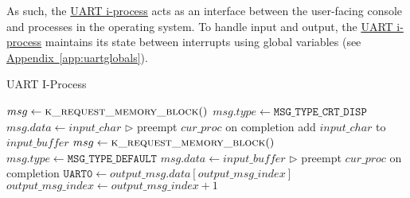 \documentclass[12pt]{report}
\begin{document}
As such, the \hyperref[alg:uartiprocess]{UART i-process} acts as an interface between the user-facing console and processes in the operating system. To handle input and output, the \hyperref[alg:uartiprocess]{UART i-process} maintains its state between interrupts using global variables (see \hyperref[app:uartglobals]{Appendix~\ref*{app:uartglobals}}).

\begin{algorithm}
\caption{UART I-Process}
\label{alg:uartiprocess}
\begin{algorithmic}[1]
         
            \State $msg \leftarrow \Call{k\_request\_memory\_block}{\null}$
            \State $msg.type \leftarrow \texttt{MSG_TYPE_CRT_DISP}$
            \State $msg.data \leftarrow input\_char$
            \State {}
            \State $\triangleright$ preempt $cur\_proc$ on completion
        \EndIf
                \State add $input\_char$ to $\mathit{input\_buffer}$
            \Else
                \State $msg \leftarrow \Call{k\_request\_memory\_block}{\null}$
                \State $msg.type \leftarrow \texttt{MSG_TYPE_DEFAULT}$
                \State $msg.data \leftarrow \mathit{input\_buffer}$
                \State {} 
                \State $\triangleright$ preempt $cur\_proc$ on completion
            \EndIf
        \State $\texttt{UART0} \leftarrow output\_msg.data[output\_msg\_index]$
        \State $output\_msg\_index \leftarrow output\_msg\_index + 1$
    \EndIf
\EndProcedure
\end{algorithmic}
\end{algorithm}
\end{document}
